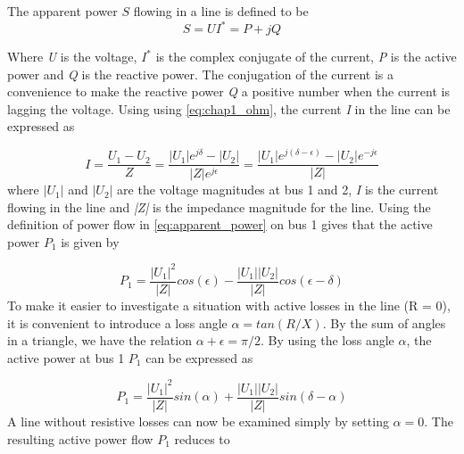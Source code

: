 \documentclass[class=book, crop=false]{standalone}
\begin{document}
The apparent power $S$ flowing in a line is defined to be
\begin{equation}\label{eq:apparent_power}
    S  = UI^{*} = P + jQ
\end{equation}

Where \textit{U} is the voltage, $I^{*}$ is the complex conjugate of the current, \textit{P} is the active power and \textit{Q} is the reactive power. The conjugation of the current is a convenience to make the reactive power \textit{Q} a positive number when the current is lagging the voltage. Using using \eqref{eq:chap1_ohm}, the current \textit{I} in the line can be expressed as

\begin{equation}\label{eq:two_port_current}
    I  = \frac{U_{1} - U_{2}}{Z}
    = \frac{|U_{1}|e^{j\delta} - |U_{2}|}{|Z|e^{j\epsilon}}
    = \frac{|U_{1}|e^{j(\delta- \epsilon)} - |U_{2}|e^{-j\epsilon}}{|Z|}
\end{equation}
where $|U_{1}|$ and $|U_{2}|$ are the voltage magnitudes at bus 1 and 2, \textit{I} is the current flowing in the line and \textit{|Z|} is the impedance magnitude for the line. Using the definition of power flow in \eqref{eq:apparent_power} on bus 1 gives that the active power $P_{1}$ is given by

\begin{equation}\label{eq:two_port_active_power}
P_{1} = \frac{|U_{1}|^2}{|Z|}cos(\epsilon) - \frac{|U_{1}||U_{2}|}{|Z|}cos(\epsilon - \delta)
\end{equation}
To make it easier to investigate a situation with active losses in the line (R = 0), it is convenient to introduce a loss angle $\alpha = tan(R/X)$. By the sum of angles in a triangle, we have the relation $\alpha + \epsilon = \pi/2$. By using the loss angle $\alpha$, the active power at bus 1 $P_{1}$ can be expressed as

\begin{equation}\label{eq:two_port_active_power_good}
P_{1} = \frac{|U_{1}|^2}{|Z|}sin(\alpha) + \frac{|U_{1}||U_{2}|}{|Z|}sin(\delta -\alpha)
\end{equation}
A line without resistive losses can now be examined simply by setting $\alpha = 0$. The resulting active power flow $P_{1}$ reduces to
\end{document}
